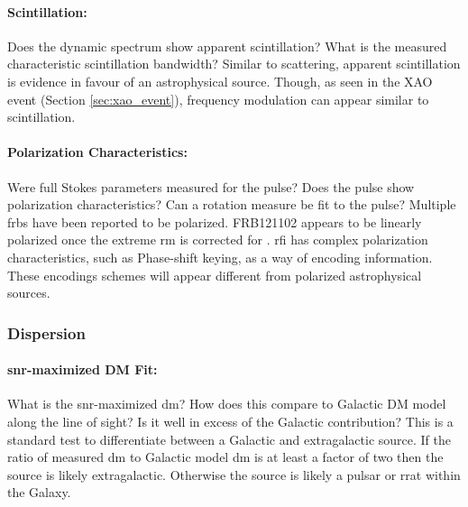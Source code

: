 \documentclass[a4paper,fleqn,usenatbib]{mnras}
\begin{document}

\paragraph{Scintillation:}

Does the dynamic spectrum show apparent scintillation? What is the measured
characteristic scintillation bandwidth? Similar to scattering, apparent
scintillation is evidence in favour of an astrophysical source. Though, as seen
in the XAO event (Section \ref{sec:xao_event}), frequency modulation can appear
similar to scintillation.

\paragraph{Polarization Characteristics:}

Were full Stokes parameters measured for the pulse? Does the pulse show
polarization characteristics? Can a rotation measure be fit to the pulse?
Multiple \glspl{frb} have been reported to be polarized.  FRB121102 appears to
be linearly polarized once the extreme \gls{rm} is corrected for
\citep{2018Natur.553..182M}.  \gls{rfi} has complex polarization
characteristics, such as Phase-shift keying, as a way of encoding information.
These encodings schemes will appear different from polarized astrophysical
sources.

\subsubsection{Dispersion}

\paragraph{\gls{snr}-maximized DM Fit:}

What is the \gls{snr}-maximized \gls{dm}? How does this compare to Galactic DM
model along the line of sight? Is it well in excess of the Galactic
contribution? This is a standard test to differentiate between a Galactic and
extragalactic source. If the ratio of measured \gls{dm} to Galactic model
\gls{dm} is at least a factor of two then the source is likely extragalactic.
Otherwise the source is likely a pulsar or \gls{rrat} within the Galaxy.
\end{document}
